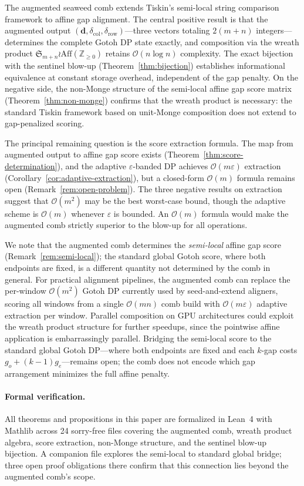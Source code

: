 \documentclass[11pt, a4paper]{article}
\theoremstyle{definition}
\theoremstyle{remark}
\newcommand{\dcol}{\mathbf{d}}
\newcommand{\bigO}{\mathcal{O}}
\begin{document}
\begin{sloppypar}
The augmented seaweed comb extends Tiskin's semi-local string
comparison framework to affine gap alignment.
The central positive result is that the augmented output
$(\dcol, \delta_{\mathrm{col}}, \delta_{\mathrm{row}})$---three
vectors totaling $2(m{+}n)$ integers---determines the complete
Gotoh DP state exactly, and composition via the wreath product
$\mathfrak{S}_{m+n} \wr \mathrm{Aff}(\mathbb{Z}_{\geq 0})$
retains $\bigO(n \log n)$ complexity.
The exact bijection with the sentinel blow-up
(Theorem~\ref{thm:bijection}) establishes informational
equivalence at constant storage overhead, independent of the gap
penalty.  On the negative side, the non-Monge structure of the
semi-local affine gap score matrix
(Theorem~\ref{thm:non-monge}) confirms that the wreath product
is necessary: the standard Tiskin framework based on unit-Monge
composition does not extend to gap-penalized scoring.

The principal remaining question is the score extraction formula.
The map from augmented output to affine gap score exists
(Theorem~\ref{thm:score-determination}), and the adaptive
$\varepsilon$-banded DP achieves $\bigO(m\varepsilon)$ extraction
(Corollary~\ref{cor:adaptive-extraction}), but a closed-form
$\bigO(m)$ formula remains open
(Remark~\ref{rem:open-problem}).  The three negative results on
extraction suggest that $\bigO(m^2)$ may be the best worst-case
bound, though the adaptive scheme is $\bigO(m)$ whenever
$\varepsilon$ is bounded.
An $\bigO(m)$ formula would make the augmented comb strictly superior to the blow-up for all operations.

We note that the augmented comb determines the \emph{semi-local} affine gap score (Remark~\ref{rem:semi-local});
the standard global Gotoh score, where both endpoints are fixed, is a different quantity not determined by the comb in general.
For practical alignment pipelines, the augmented comb can replace the per-window $\bigO(m^2)$ Gotoh DP currently used by seed-and-extend aligners, scoring all windows from a single $\bigO(mn)$ comb build with $\bigO(m\varepsilon)$ adaptive extraction per window.
Parallel composition on GPU architectures could exploit the wreath product structure for further speedups, since the pointwise affine application is embarrassingly parallel.
Bridging the semi-local score to the standard global Gotoh DP---where both endpoints are fixed and each $k$-gap costs $g_o + (k{-}1)g_e$---remains open; the comb does not encode which gap arrangement minimizes the full affine penalty.

\paragraph{Formal verification.}
All theorems and propositions in this paper are formalized in
Lean~4 with Mathlib across 24 sorry-free files covering the
augmented comb, wreath product algebra, score extraction,
non-Monge structure, and the sentinel blow-up bijection.
A companion file explores the semi-local to standard global
bridge; three open proof obligations there confirm that this
connection lies beyond the augmented comb's scope.
\end{sloppypar}
\end{document}

